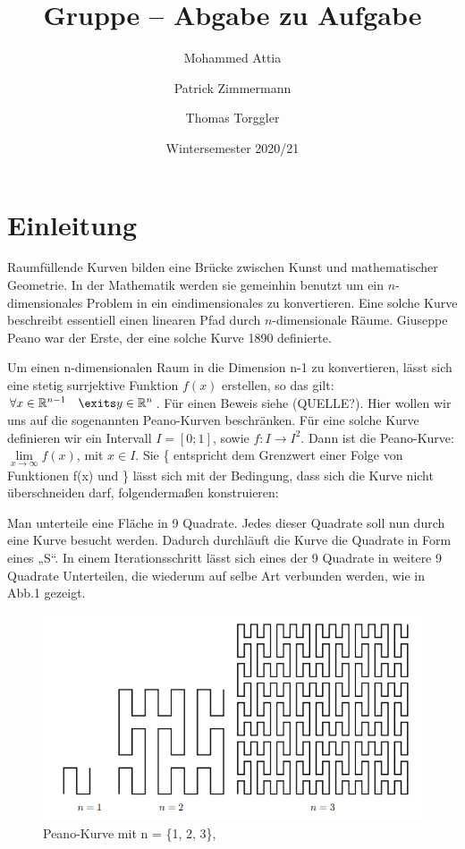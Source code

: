 \documentclass[course=asp]{aspdoc}
\author{Mohammed Attia \and Patrick Zimmermann \and Thomas Torggler}
\date{Wintersemester 2020/21} %
\title{Gruppe \theGroup{} -- Abgabe zu Aufgabe \theNumber}
\begin{document}
\maketitle

\newpage
\section{Einleitung}

Raumfüllende Kurven bilden eine Brücke zwischen Kunst und mathematischer Geometrie. In der Mathematik werden sie gemeinhin benutzt um ein $n$-dimensionales Problem in ein eindimensionales zu konvertieren. Eine solche Kurve beschreibt essentiell einen linearen Pfad durch $n$-dimensionale Räume. Giuseppe Peano war der Erste, der eine solche Kurve 1890 definierte.

Um einen n-dimensionalen Raum in die Dimension n-1 zu konvertieren, lässt sich eine stetig surrjektive Funktion $f(x)$ erstellen, so das gilt: $\forall x \in \mathbb{R}^{n-1} \quad \exits y \in \mathbb{R}^n$. Für einen Beweis siehe (QUELLE?). Hier wollen wir uns auf die sogenannten Peano-Kurven beschränken. Für eine solche Kurve definieren wir ein Intervall $I = [0;1]$, sowie  $f: I \rightarrow I^2 $. Dann ist die Peano-Kurve: $\lim\limits_{x \to \infty}f(x)$, mit $x \in I$. Sie \{ entspricht dem Grenzwert einer Folge von Funktionen f(x) und \} lässt sich mit der Bedingung, dass sich die Kurve nicht überschneiden darf, folgendermaßen konstruieren:

Man unterteile eine Fläche in 9 Quadrate. Jedes dieser Quadrate soll nun durch eine Kurve besucht werden. Dadurch durchläuft die Kurve die Quadrate in Form eines „S“.
In einem Iterationsschritt lässt sich eines der 9 Quadrate in weitere 9 Quadrate Unterteilen, die wiederum auf selbe Art verbunden werden, wie in Abb.1 gezeigt.

\begin{figure} [ht] %
\centering
\includegraphics{PeanoBsp.png}
\caption{Peano-Kurve mit n = \{1, 2, 3\}, ~\cite{aufgabenstellung}}\label{Abb:Peano}	
\end{figure}
\end{document}
